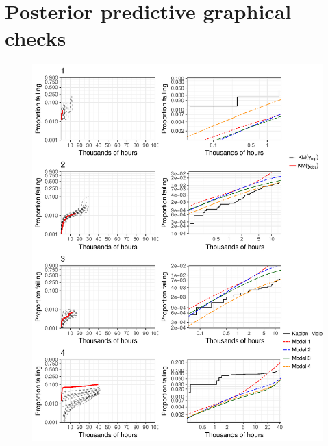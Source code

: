 \documentclass[12pt]{article}
\begin{document}
\section{Posterior predictive graphical checks}
\begin{figure}[H]
\includegraphics[width=\textwidth]{ppcheck-v2-1.pdf}
\end{figure}
\end{document}
